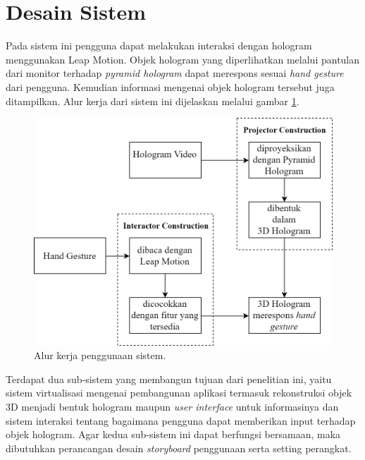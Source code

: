 \section{Desain Sistem}
\vspace{1ex}
	Pada sistem ini pengguna dapat melakukan interaksi dengan hologram menggunakan Leap Motion. Objek hologram yang diperlihatkan melalui pantulan dari monitor terhadap \textit{pyramid hologram} dapat merespons sesuai \textit{hand gesture} dari pengguna. Kemudian informasi mengenai objek hologram tersebut juga ditampilkan. Alur kerja dari sistem ini dijelaskan melalui gambar \ref{fig:alur_kerja}.
	\vspace{-2ex}
	\begin{figure} [H]
		\includegraphics[scale=0.25]{img/bab3/alur_kerja.png}
		\caption{Alur kerja penggunaan sistem.}
		\label{fig:alur_kerja}
	\end{figure}
	\vspace{-2ex}
	Terdapat dua sub-sistem yang membangun tujuan dari penelitian ini, yaitu sistem virtualisasi mengenai pembangunan aplikasi termasuk rekonstruksi objek 3D menjadi bentuk hologram maupun \textit{user interface} untuk informasinya dan sistem interaksi tentang bagaimana pengguna dapat memberikan input terhadap objek hologram. Agar kedua sub-sistem ini dapat berfungsi bersamaan, maka dibutuhkan perancangan desain \textit{storyboard} penggunaan serta setting perangkat.
\vspace{1.5ex}

